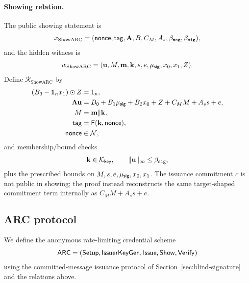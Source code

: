 \paragraph{Showing relation.}
The public showing statement is
\[
  x_{\mathrm{ShowARC}}=(\mathsf{nonce},\mathsf{tag},\mathbf{A},B,C_M,A_s,\beta_{\mathtt{msg}},\beta_{\mathtt{sig}}),
\]
and the hidden witness is
\[
  w_{\mathrm{ShowARC}}=(\mathbf{u},M,\mathbf{m},\mathbf{k},s,e,\mu_{\mathsf{sig}},x_0,x_1,Z).
\]
Define \(\mathcal R_{\mathrm{ShowARC}}\) by
\begin{align}
  (B_3-\mathbf 1_nx_1)\odot Z&=1_n, \label{eq:showarc-rel-inv}\\
  \mathbf{A}\mathbf{u}&=B_0+B_1\mu_{\mathsf{sig}}+B_2x_0+Z+C_MM+A_s s+e, \label{eq:showarc-rel-sig}\\
  M&=\mathbf{m}\Vert\mathbf{k}, \label{eq:showarc-rel-encoding}\\
  \mathsf{tag}&=\mathsf{F}(\mathbf{k},\mathsf{nonce}), \label{eq:showarc-rel-prf}\\
  \mathsf{nonce}&\in\mathcal{N}, \label{eq:showarc-rel-nonce}
\end{align}
and membership/bound checks
\[
  \mathbf{k}\in\mathcal K_{\mathsf{key}},
  \qquad
  \|\mathbf{u}\|_\infty\le\beta_{\mathtt{sig}},
\]
plus the prescribed bounds on \(M,s,e,\mu_{\mathsf{sig}},x_0,x_1\).  The issuance commitment \(c\) is not public in showing;
the proof instead reconstructs the same target-shaped commitment term internally as \(C_MM+A_s s+e\).

\subsection{ARC protocol}
We define the anonymous rate-limiting credential scheme
\[
  \mathsf{ARC}=(\mathsf{Setup},\mathsf{IssuerKeyGen},\mathsf{Issue},\mathsf{Show},\mathsf{Verify})
\]
using the committed-message issuance protocol of Section~\ref{sec:blind-signature} and the relations above.

